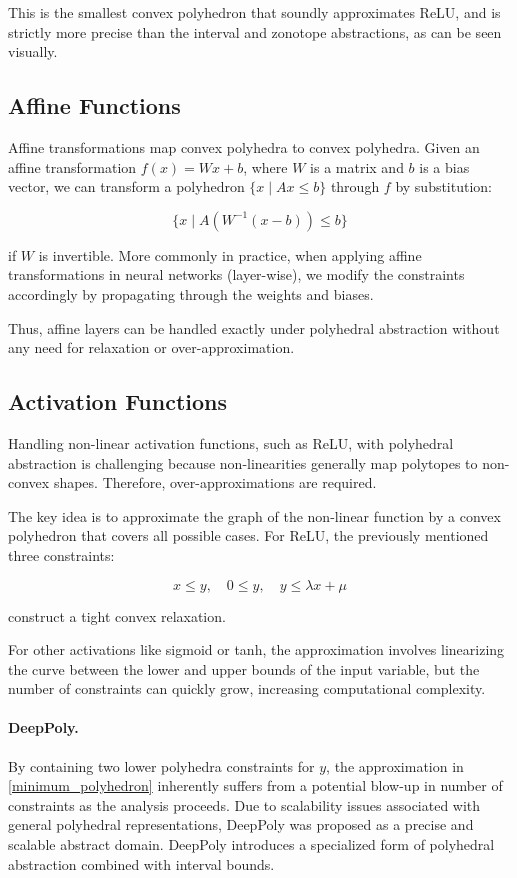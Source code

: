\documentclass[oneside,11pt,dvipsnames]{book}
\numberwithin{equation}{section}
\theoremstyle{definition}
\theoremstyle{remark}
\begin{document}
This is the smallest convex polyhedron that soundly approximates ReLU, and is strictly more precise than the interval and zonotope abstractions, as can be seen visually.

\subsection{Affine Functions}

Affine transformations map convex polyhedra to convex polyhedra.  
Given an affine transformation \(f(x) = Wx + b\), where \(W\) is a matrix and \(b\) is a bias vector, we can transform a polyhedron \(\{x \mid A x \leq b\}\) through \(f\) by substitution:

\[
\{x \mid A (W^{-1}(x - b)) \leq b\}
\]

if \(W\) is invertible. More commonly in practice, when applying affine transformations in neural networks (layer-wise), we modify the constraints accordingly by propagating through the weights and biases.

Thus, affine layers can be handled exactly under polyhedral abstraction without any need for relaxation or over-approximation.

\subsection{Activation Functions}

Handling non-linear activation functions, such as ReLU, with polyhedral abstraction is challenging because non-linearities generally map polytopes to non-convex shapes. Therefore, over-approximations are required.

The key idea is to approximate the graph of the non-linear function by a convex polyhedron that covers all possible cases. For ReLU, the previously mentioned three constraints:

\begin{equation}\label{minimum_polyhedron}
x \leq y, \quad 0 \leq y, \quad y \leq \lambda x + \mu
\end{equation}


construct a tight convex relaxation.

For other activations like sigmoid or tanh, the approximation involves linearizing the curve between the lower and upper bounds of the input variable, but the number of constraints can quickly grow, increasing computational complexity.

\paragraph{DeepPoly.}  
By containing two lower polyhedra constraints for \(y\), the approximation in \ref{minimum_polyhedron} inherently suffers from a potential blow-up in number of constraints as the analysis proceeds. Due to scalability issues associated with general polyhedral representations, DeepPoly \cite{singh2019abstract} was proposed as a precise and scalable abstract domain. DeepPoly introduces a specialized form of polyhedral abstraction combined with interval bounds. 
\end{document}
